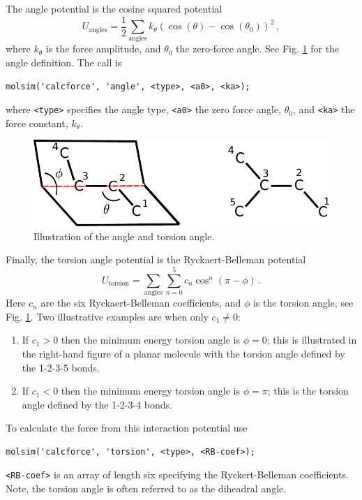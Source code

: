 \documentclass[11pt]{article}
\begin{document}
The angle potential is the cosine squared potential
\begin{equation}
  U_{\mathrm{angles}}=\frac{1}{2}\sum_{\mathrm{angles}} k_{\theta} (\cos(\theta) - \cos(\theta_0))^2 \, ,
\end{equation}
where $k_\theta$ is the force amplitude, and $\theta_0$ the zero-force
angle. See Fig. \ref{fig:torsion} for the angle definition. The call is
\begin{verbatim}
molsim('calcforce', 'angle', <type>, <a0>, <ka>);
\end{verbatim}
where \verb!<type>! specifies the angle type, \verb!<a0>! the zero force angle,
$\theta_0$, and \verb!<ka>! the force constant, $k_\theta$.  
\begin{figure}[h]
  \begin{center}
    \includegraphics[scale=.7]{diheadral.pdf}
  \caption{
    \label{fig:torsion}
    Illustration of the angle and torsion angle.
  }
  \end{center}
\end{figure}

Finally, the torsion angle potential is the Ryckaert-Belleman potential 
\begin{equation}
  U_\mathrm{torsion}=\sum_{\mathrm{angles}} \sum_{n=0}^5 c_n
  \cos^n(\pi-\phi)
   \, . 
\end{equation}
Here $c_n$ are the six Ryckaert-Belleman coefficients, and $\phi$ is the
torsion angle, see Fig. \ref{fig:torsion}. Two illustrative 
examples are when only $c_1 \neq 0$:
\begin{enumerate}
\item If $c_1 > 0$ then the minimum energy torsion angle is $\phi = 0$; this is
  illustrated in the right-hand figure of a planar molecule with the torsion
  angle defined by the 1-2-3-5 bonds. 
\item If $c_1 < 0$ then the minimum energy torsion angle is $\phi = \pi$; this
  is the torsion angle defined by the 1-2-3-4 bonds. 
\end{enumerate}
To calculate the force from this interaction potential use
\begin{verbatim}
molsim('calcforce', 'torsion', <type>, <RB-coef>);
\end{verbatim}
\verb!<RB-coef>! is an array of length six specifying the Ryckert-Belleman
coefficients. Note, the torsion angle is often referred to as the diheadral angle. 
\end{document}
